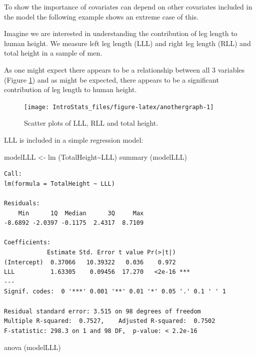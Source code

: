 \documentclass[
  oneside]{krantz}
\newenvironment{Shaded}{\begin{snugshade}}{\end{snugshade}}
\newcommand{\FunctionTok}[1]{\textcolor[rgb]{0.00,0.00,0.00}{#1}}
\newcommand{\NormalTok}[1]{#1}
\newcommand{\OtherTok}[1]{\textcolor[rgb]{0.56,0.35,0.01}{#1}}
\newcommand{\SpecialCharTok}[1]{\textcolor[rgb]{0.00,0.00,0.00}{#1}}
\begin{document}
To show the importance of covariates can depend on other covariates included in the model the following example shows an extreme case of this.

Imagine we are interested in understanding the contribution of leg length to human height. We measure left leg length (LLL) and right leg length (RLL) and total height in a sample of men.

As one might expect there appears to be a relationship between all 3 variables (Figure \ref{fig:anothergraph}) and as might be expected, there appears to be a significant contribution of leg length to human height.

\begin{figure}

{\centering \texttt{[image: IntroStats\_files/figure-latex/anothergraph-1]} 

}

\caption{Scatter plots of LLL, RLL and total height. }\label{fig:anothergraph}
\end{figure}

LLL is included in a simple regression model:

\begin{Shaded}
\begin{Highlighting}[]
\NormalTok{modelLLL }\OtherTok{\textless{}{-}} \FunctionTok{lm}\NormalTok{ (TotalHeight}\SpecialCharTok{\textasciitilde{}}\NormalTok{LLL)}
\FunctionTok{summary}\NormalTok{ (modelLLL)}
\end{Highlighting}
\end{Shaded}

\begin{verbatim}
Call:
lm(formula = TotalHeight ~ LLL)

Residuals:
    Min      1Q  Median      3Q     Max 
-8.6892 -2.0397 -0.1175  2.4317  8.7109 

Coefficients:
            Estimate Std. Error t value Pr(>|t|)    
(Intercept)  0.37066   10.39322   0.036    0.972    
LLL          1.63305    0.09456  17.270   <2e-16 ***
---
Signif. codes:  0 '***' 0.001 '**' 0.01 '*' 0.05 '.' 0.1 ' ' 1

Residual standard error: 3.515 on 98 degrees of freedom
Multiple R-squared:  0.7527,    Adjusted R-squared:  0.7502 
F-statistic: 298.3 on 1 and 98 DF,  p-value: < 2.2e-16
\end{verbatim}

\begin{Shaded}
\begin{Highlighting}[]
\FunctionTok{anova}\NormalTok{ (modelLLL)}
\end{Highlighting}
\end{Shaded}
\end{document}
